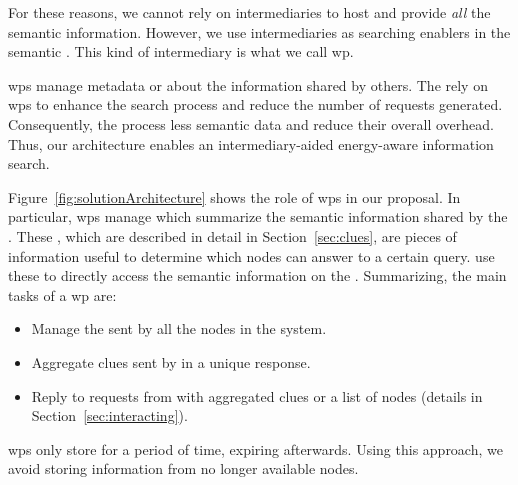 For these reasons, we cannot rely on intermediaries to host and provide \emph{all} the semantic information.
However, we use intermediaries as searching enablers in the semantic \Space{}.
This kind of intermediary is what we call \acl{wp}.

\acp{wp} manage metadata or \clues{} about the information shared by others.
The \consumers{} rely on \acp{wp} to enhance the search process and reduce the number of requests generated.
Consequently, the \providers{} process less semantic data and reduce their overall overhead.
Thus, our architecture enables an intermediary-aided energy-aware information search.




Figure~\ref{fig:solutionArchitecture} shows the role of \acp{wp} in our proposal.
In particular, \acp{wp} manage \clues{} which summarize the semantic information shared by the \providers{}.
These \clues{}, which are described in detail in Section~\ref{sec:clues}, are pieces of information useful to determine which nodes can answer to a certain query.
\consumers{} use these \clues{} to directly access the semantic information on the \providers{}.
Summarizing, the main tasks of a \ac{wp} are:
\begin{itemize}
 \item Manage the \clues{} sent by all the nodes in the system.
 \item Aggregate clues sent by \providers{} in a unique response.
 \item Reply to requests from \consumers{} with aggregated clues or a list of nodes (details in Section~\ref{sec:interacting}).
\end{itemize}

\acp{wp} only store \clues{} for a period of time, expiring afterwards.
Using this approach, we avoid storing information from no longer available nodes.




